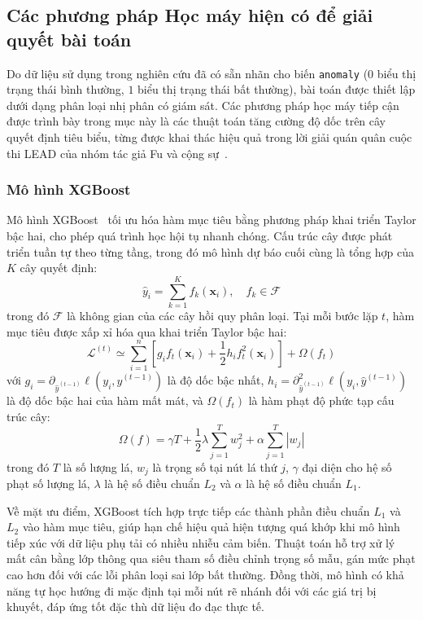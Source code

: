 \subsection{Các phương pháp Học máy hiện có để giải quyết bài toán}

Do dữ liệu sử dụng trong nghiên cứu đã có sẵn nhãn cho biến \texttt{anomaly} ($0$ biểu thị trạng thái bình thường, $1$ biểu thị trạng thái bất thường), bài toán được thiết lập dưới dạng phân loại nhị phân có giám sát. Các phương pháp học máy tiếp cận được trình bày trong mục này là các thuật toán tăng cường độ dốc trên cây quyết định tiêu biểu, từng được khai thác hiệu quả trong lời giải quán quân cuộc thi LEAD của nhóm tác giả Fu và cộng sự~\cite{lead_winner}.

\subsubsection{Mô hình XGBoost}

Mô hình XGBoost~\cite{xgboost} tối ưu hóa hàm mục tiêu bằng phương pháp khai triển Taylor bậc hai, cho phép quá trình học hội tụ nhanh chóng. Cấu trúc cây được phát triển tuần tự theo từng tầng, trong đó mô hình dự báo cuối cùng là tổng hợp của $K$ cây quyết định:
\begin{equation*}
    \hat{y}_i = \sum_{k=1}^{K} f_k(\mathbf{x}_i), \quad f_k \in \mathcal{F}
\end{equation*}
trong đó $\mathcal{F}$ là không gian của các cây hồi quy phân loại. Tại mỗi bước lặp $t$, hàm mục tiêu được xấp xỉ hóa qua khai triển Taylor bậc hai:
\begin{equation*}
    \mathcal{L}^{(t)} \simeq \sum_{i=1}^{n} \left[ g_i f_t(\mathbf{x}_i) + \frac{1}{2} h_i f_t^2(\mathbf{x}_i) \right] + \Omega(f_t)
\end{equation*}
với $g_i = \partial_{\hat{y}^{(t-1)}} \ell(y_i, \hat{y}^{(t-1)})$ là độ dốc bậc nhất, $h_i = \partial^2_{\hat{y}^{(t-1)}} \ell(y_i, \hat{y}^{(t-1)})$ là độ dốc bậc hai của hàm mất mát, và $\Omega(f_t)$ là hàm phạt độ phức tạp cấu trúc cây:
\begin{equation*}
    \Omega(f) = \gamma T + \frac{1}{2} \lambda \sum_{j=1}^{T} w_j^2 + \alpha \sum_{j=1}^{T} |w_j|
\end{equation*}
trong đó $T$ là số lượng lá, $w_j$ là trọng số tại nút lá thứ $j$, $\gamma$ đại diện cho hệ số phạt số lượng lá, $\lambda$ là hệ số điều chuẩn $L_2$ và $\alpha$ là hệ số điều chuẩn $L_1$.

Về mặt ưu điểm, XGBoost tích hợp trực tiếp các thành phần điều chuẩn $L_1$ và $L_2$ vào hàm mục tiêu, giúp hạn chế hiệu quả hiện tượng quá khớp khi mô hình tiếp xúc với dữ liệu phụ tải có nhiều nhiễu cảm biến. Thuật toán hỗ trợ xử lý mất cân bằng lớp thông qua siêu tham số điều chỉnh trọng số mẫu, gán mức phạt cao hơn đối với các lỗi phân loại sai lớp bất thường. Đồng thời, mô hình có khả năng tự học hướng đi mặc định tại mỗi nút rẽ nhánh đối với các giá trị bị khuyết, đáp ứng tốt đặc thù dữ liệu đo đạc thực tế.

